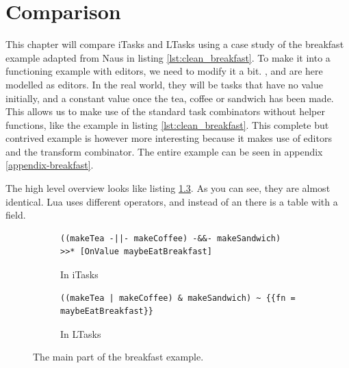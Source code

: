 \chapter{Comparison}\label{comparison}
This chapter will compare iTasks and LTasks using a case study of the breakfast example adapted from Naus \cite{naus2020assisting} in listing \ref{lst:clean_breakfast}. To make it into a functioning example with editors, we need to modify it a bit. ,  and  are here modelled as editors. In the real world, they will be tasks that have no value initially, and a constant value once the tea, coffee or sandwich has been made. This allows us to make use of the standard task combinators without helper functions, like the example in listing \ref{lst:clean_breakfast}. This complete but contrived example is however more interesting because it makes use of editors and the transform combinator. The entire example can be seen in appendix \ref{appendix-breakfast}.

The high level overview looks like listing \ref{lst:comparison_breakfast}. As you can see, they are almost identical. Lua uses different operators, and instead of an  there is a table with a  field.

\begin{figure}[ht]
\begin{subfigure}{\textwidth}
\centering
\begin{verbatim}
((makeTea -||- makeCoffee) -&&- makeSandwich) >>* [OnValue maybeEatBreakfast]
\end{verbatim}
\caption{In iTasks}
\label{lst:comparison_breakfast_clean}
\end{subfigure}
\begin{subfigure}{\textwidth}
\centering
\bigskip %
\begin{verbatim}
((makeTea | makeCoffee) & makeSandwich) ~ {{fn = maybeEatBreakfast}}
\end{verbatim}
\caption{In LTasks}
\label{lst:comparison_breakfast_lua}
\end{subfigure}
\caption{The main part of the breakfast example.}
\label{lst:comparison_breakfast}
\end{figure}

